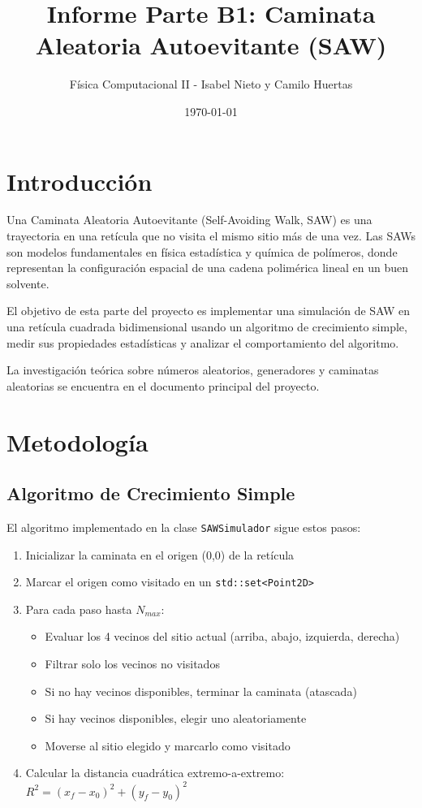 \documentclass[11pt,a4paper]{article}
\title{Informe Parte B1: Caminata Aleatoria Autoevitante (SAW)}
\author{Física Computacional II - Isabel Nieto y Camilo Huertas}
\date{\today}
\begin{document}
\maketitle
\tableofcontents
\newpage

\section{Introducción}
Una Caminata Aleatoria Autoevitante (Self-Avoiding Walk, SAW) es una trayectoria en una retícula que no visita el mismo sitio más de una vez. Las SAWs son modelos fundamentales en física estadística y química de polímeros, donde representan la configuración espacial de una cadena polimérica lineal en un buen solvente.

El objetivo de esta parte del proyecto es implementar una simulación de SAW en una retícula cuadrada bidimensional usando un algoritmo de crecimiento simple, medir sus propiedades estadísticas y analizar el comportamiento del algoritmo.

La investigación teórica sobre números aleatorios, generadores y caminatas aleatorias se encuentra en el documento principal del proyecto.

\section{Metodología}

\subsection{Algoritmo de Crecimiento Simple}
El algoritmo implementado en la clase \texttt{SAWSimulador} sigue estos pasos:

\begin{enumerate}
    \item Inicializar la caminata en el origen (0,0) de la retícula
    \item Marcar el origen como visitado en un \texttt{std::set<Point2D>}
    \item Para cada paso hasta $N_{max}$:
    \begin{itemize}
        \item Evaluar los 4 vecinos del sitio actual (arriba, abajo, izquierda, derecha)
        \item Filtrar solo los vecinos no visitados
        \item Si no hay vecinos disponibles, terminar la caminata (atascada)
        \item Si hay vecinos disponibles, elegir uno aleatoriamente
        \item Moverse al sitio elegido y marcarlo como visitado
    \end{itemize}
    \item Calcular la distancia cuadrática extremo-a-extremo: $R^2 = (x_f - x_0)^2 + (y_f - y_0)^2$
\end{enumerate}
\end{document}
